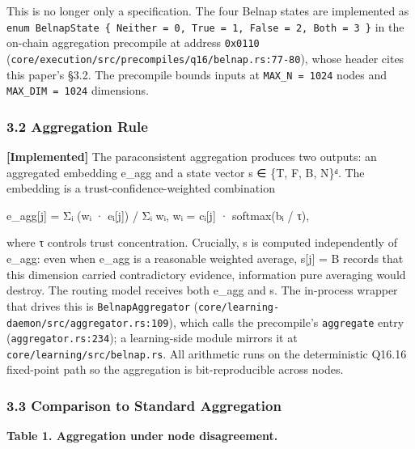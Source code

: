 This is no longer only a specification. The four Belnap states are
implemented as
\texttt{enum\ BelnapState\ \{\ Neither\ =\ 0,\ True\ =\ 1,\ False\ =\ 2,\ Both\ =\ 3\ \}}
in the on-chain aggregation precompile at address \texttt{0x0110}
(\texttt{core/execution/src/precompiles/q16/belnap.rs:77-80}), whose
header cites this paper's §3.2. The precompile bounds inputs at
\texttt{MAX\_N\ =\ 1024} nodes and \texttt{MAX\_DIM\ =\ 1024}
dimensions.

\subsubsection{3.2 Aggregation Rule}\label{aggregation-rule}

\textbf{{[}Implemented{]}} The paraconsistent aggregation produces two
outputs: an aggregated embedding e\_agg and a state vector s ∈ \{T, F,
B, N\}ᵈ. The embedding is a trust-confidence-weighted combination

e\_agg{[}j{]} = Σᵢ (wᵢ · eᵢ{[}j{]}) / Σᵢ wᵢ, wᵢ = cᵢ{[}j{]} · softmax(bᵢ
/ τ),

where τ controls trust concentration. Crucially, s is computed
independently of e\_agg: even when e\_agg is a reasonable weighted
average, s{[}j{]} = B records that this dimension carried contradictory
evidence, information pure averaging would destroy. The routing model
receives both e\_agg and s. The in-process wrapper that drives this is
\texttt{BelnapAggregator}
(\texttt{core/learning-daemon/src/aggregator.rs:109}), which calls the
precompile's \texttt{aggregate} entry (\texttt{aggregator.rs:234}); a
learning-side module mirrors it at \texttt{core/learning/src/belnap.rs}.
All arithmetic runs on the deterministic Q16.16 fixed-point path so the
aggregation is bit-reproducible across nodes.

\subsubsection{3.3 Comparison to Standard
Aggregation}\label{comparison-to-standard-aggregation}

\textbf{Table 1. Aggregation under node disagreement.}

